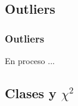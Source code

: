 \documentclass[8pt]{beamer}
\begin{document}
\subsection{Outliers}
\begin{frame}\frametitle{Outliers}
En proceso ...
\end{frame}

\subsection{Clases y $\chi^2$ }
\end{document}
